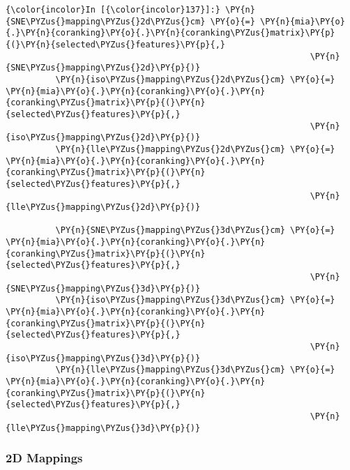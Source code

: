     \begin{Verbatim}[commandchars=\\\{\}]
{\color{incolor}In [{\color{incolor}137}]:} \PY{n}{SNE\PYZus{}mapping\PYZus{}2d\PYZus{}cm} \PY{o}{=} \PY{n}{mia}\PY{o}{.}\PY{n}{coranking}\PY{o}{.}\PY{n}{coranking\PYZus{}matrix}\PY{p}{(}\PY{n}{selected\PYZus{}features}\PY{p}{,}
                                                             \PY{n}{SNE\PYZus{}mapping\PYZus{}2d}\PY{p}{)}
          \PY{n}{iso\PYZus{}mapping\PYZus{}2d\PYZus{}cm} \PY{o}{=} \PY{n}{mia}\PY{o}{.}\PY{n}{coranking}\PY{o}{.}\PY{n}{coranking\PYZus{}matrix}\PY{p}{(}\PY{n}{selected\PYZus{}features}\PY{p}{,}
                                                             \PY{n}{iso\PYZus{}mapping\PYZus{}2d}\PY{p}{)}
          \PY{n}{lle\PYZus{}mapping\PYZus{}2d\PYZus{}cm} \PY{o}{=} \PY{n}{mia}\PY{o}{.}\PY{n}{coranking}\PY{o}{.}\PY{n}{coranking\PYZus{}matrix}\PY{p}{(}\PY{n}{selected\PYZus{}features}\PY{p}{,}
                                                             \PY{n}{lle\PYZus{}mapping\PYZus{}2d}\PY{p}{)}

          \PY{n}{SNE\PYZus{}mapping\PYZus{}3d\PYZus{}cm} \PY{o}{=} \PY{n}{mia}\PY{o}{.}\PY{n}{coranking}\PY{o}{.}\PY{n}{coranking\PYZus{}matrix}\PY{p}{(}\PY{n}{selected\PYZus{}features}\PY{p}{,}
                                                             \PY{n}{SNE\PYZus{}mapping\PYZus{}3d}\PY{p}{)}
          \PY{n}{iso\PYZus{}mapping\PYZus{}3d\PYZus{}cm} \PY{o}{=} \PY{n}{mia}\PY{o}{.}\PY{n}{coranking}\PY{o}{.}\PY{n}{coranking\PYZus{}matrix}\PY{p}{(}\PY{n}{selected\PYZus{}features}\PY{p}{,}
                                                             \PY{n}{iso\PYZus{}mapping\PYZus{}3d}\PY{p}{)}
          \PY{n}{lle\PYZus{}mapping\PYZus{}3d\PYZus{}cm} \PY{o}{=} \PY{n}{mia}\PY{o}{.}\PY{n}{coranking}\PY{o}{.}\PY{n}{coranking\PYZus{}matrix}\PY{p}{(}\PY{n}{selected\PYZus{}features}\PY{p}{,}
                                                             \PY{n}{lle\PYZus{}mapping\PYZus{}3d}\PY{p}{)}
\end{Verbatim}

    \subsubsection{2D Mappings}\label{d-mappings}

